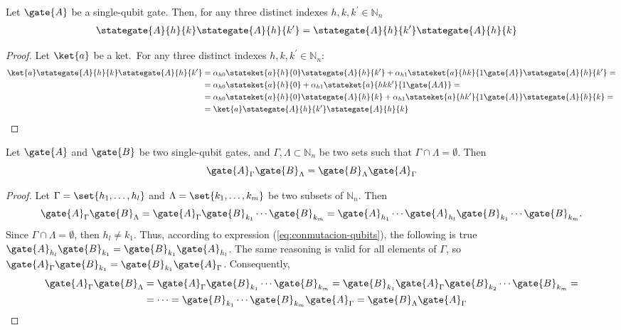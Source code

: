 \begin{proposition}
    Let $\gate{A}$ be a single-qubit gate.
    Then, for any  three distinct indexes $h,k,k^\prime \in \mathbb{N}_n$
    \begin{align}
        \stategate{A}{h}{k}\stategate{A}{h}{k^\prime} &= \stategate{A}{h}{k^\prime}\stategate{A}{h}{k}
    \end{align}
\end{proposition}

\begin{proof}
    Let $\ket{a}$ be a ket.\ For any three distinct  indexes $h,k,k^\prime \in \mathbb{N}_n$:
    \begin{align*}
        \ket{a}\stategate{A}{h}{k}\stategate{A}{h}{k^\prime}
        &=\alpha_{h0}\stateket{a}{h}{0}\stategate{A}{h}{k^\prime}+\alpha_{h1}\stateket{a}{hk}{1\gate{A}}\stategate{A}{h}{k^\prime}=\\
        &=\alpha_{h0}\stateket{a}{h}{0}+\alpha_{h1}\stateket{a}{hkk^\prime}{1\gate{AA}}=\\
        &=\alpha_{h0}\stateket{a}{h}{0}\stategate{A}{h}{k}+\alpha_{h1}\stateket{a}{hk^\prime}{1\gate{A}}\stategate{A}{h}{k}=\\
        &=\ket{a}\stategate{A}{h}{k^\prime}\stategate{A}{h}{k}
    \end{align*}
\end{proof}

\begin{proposition}
    Let $\gate{A}$ and $\gate{B}$ be two single-qubit gates, and $\Gamma, \Lambda \subset \mathbb{N}_n$ be two sets such that $\Gamma\cap\Lambda=\emptyset$.
    Then
    \begin{equation}
        \label{eq:conmutacion-sets}
        \gate{A}_\Gamma\gate{B}_{\Lambda} = \gate{B}_{\Lambda}\gate{A}_{\Gamma}
    \end{equation}
\end{proposition}
\begin{proof}
    Let $\Gamma=\set{h_1,\dots,h_l}$ and $\Lambda=\set{k_1,\dots,k_m}$ be two subsets of $\mathbb{N}_n$. Then
    \begin{align*}
        \gate{A}_{\Gamma}\gate{B}_{\Lambda}=\gate{A}_{\Gamma}\gate{B}_{k_1}\cdots\gate{B}_{k_m}=\gate{A}_{h_1}\cdots\gate{A}_{h_l}\gate{B}_{k_1}\cdots\gate{B}_{k_m}.
    \end{align*}
    Since $\Gamma\cap\Lambda=\emptyset$, then $h_l\neq k_1$. Thus, according to expression (\ref{eq:conmutacion-qubits}), the following is true $\gate{A}_{h_l}\gate{B}_{k_1}=\gate{B}_{k_1}\gate{A}_{h_l}$.
    The same reasoning is valid for all elements of $\Gamma$, so $\gate{A}_{\Gamma}\gate{B}_{k_1}=\gate{B}_{k_1}\gate{A}_{\Gamma}$. Consequently,
    \begin{align*}
        \gate{A}_{\Gamma}\gate{B}_{\Lambda}&=\gate{A}_{\Gamma}\gate{B}_{k_1}\cdots\gate{B}_{k_m}=\gate{B}_{k_1}\gate{A}_{\Gamma}\gate{B}_{k_2}\cdots\gate{B}_{k_m}=\\
        &=\dots = \gate{B}_{k_1}\cdots\gate{B}_{k_m}\gate{A}_{\Gamma}=\gate{B}_{\Lambda}\gate{A}_{\Gamma}
    \end{align*}
\end{proof}

